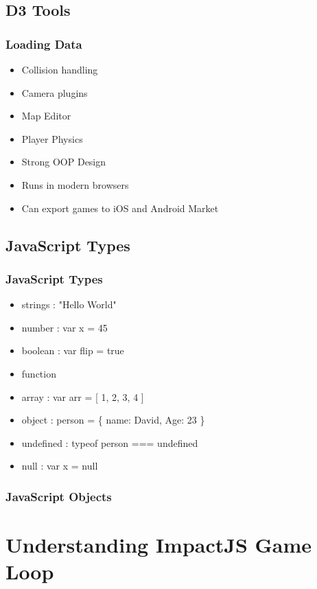 \documentclass[red]{beamer}
\begin{document}
\subsection{D3 Tools}

\begin{frame}
  \frametitle{Loading Data}   %
  
  \begin{itemize}
  \item<1-> Collision handling
  \item<2-> Camera plugins
  \item<3-> Map Editor
  \item<4-> Player Physics
  \item<5-> Strong OOP Design
  \item<6-> Runs in modern browsers
  \item<7-> Can export games to iOS and Android Market
  \end{itemize}
\end{frame}

\subsection{JavaScript Types}

\begin{frame}
	\frametitle{JavaScript Types}
	 \begin{itemize}
  		\item<1-> strings : "Hello World"
 		\item<2-> number : var x = 45
 		\item<3-> boolean : var flip = true
		\item<4-> function
		\item<5-> array : var arr = [ 1, 2, 3, 4 ]
		\item<6->object : person = \{ name: David, Age: 23 \}
		\item<7->undefined : typeof person === undefined
		\item<8->null : var x = null
 	 \end{itemize}
\end{frame}

\begin{frame}
 	\frametitle{JavaScript Objects}
		\lstI
\end{frame}

\section{Understanding ImpactJS Game Loop}
\end{document}
